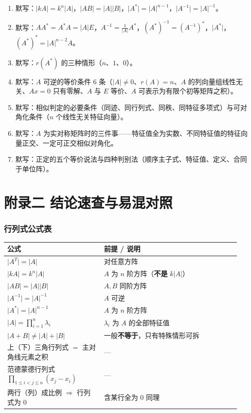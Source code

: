 \documentclass[11pt,openany,UTF8]{ctexbook}
\begin{document}
\begin{enumerate}
\item 默写：$\lvert kA\rvert=k^n\lvert A\rvert$，$\lvert AB\rvert=\lvert A\rvert\lvert B\rvert$，$\lvert A^*\rvert=\lvert A\rvert^{n-1}$，$\lvert A^{-1}\rvert=\lvert A\rvert^{-1}$。
\item 默写：$AA^*=A^*A=\lvert A\rvert E$，$A^{-1}=\frac{1}{\lvert A\rvert}A^*$，$(A^*)^{-1}=(A^{-1})^*$，$\lvert A^*\rvert$，$(A^*)^*=\lvert A\rvert^{n-2}A$。
\item 默写：$r(A^*)$ 的三种情形（$n$、$1$、$0$）。
\item 默写：$A$ 可逆的等价条件 6 条（$\lvert A\rvert\ne0$、$r(A)=n$、$A$ 的列向量组线性无关、$Ax=0$ 只有零解、$A$ 与 $E$ 等价、$A$ 可表示为有限个初等矩阵之积）。
\item 默写：相似判定的必要条件（同迹、同行列式、同秩、同特征多项式）与可对角化条件（$n$ 个线性无关特征向量）。
\item 默写：$A$ 为实对称矩阵时的三件事——特征值全为实数、不同特征值的特征向量正交、一定可正交相似对角化。
\item 默写：正定的五个等价说法与四种判别法（顺序主子式、特征值、定义、合同于单位阵）。
\end{enumerate}
\chapter*{附录二 结论速查与易混对照}
\subsection{行列式公式表}

\begingroup\small\setlength{\tabcolsep}{4.0pt}
\begin{longtable}{@{}L{0.3911\linewidth}L{0.5546\linewidth}@{}}
\toprule
\textbf{公式} & \textbf{前提 / 说明} \\
\midrule
\endhead
$\lvert A^T\rvert=\lvert A\rvert$ & 对任意方阵 \\
$\lvert kA\rvert=k^n\lvert A\rvert$ & $A$ 为 $n$ 阶方阵（\textbf{不是} $k\lvert A\rvert$） \\
$\lvert AB\rvert=\lvert A\rvert\lvert B\rvert$ & $A,B$ 同阶方阵 \\
$\lvert A^{-1}\rvert=\lvert A\rvert^{-1}$ & $A$ 可逆 \\
$\lvert A^*\rvert=\lvert A\rvert^{n-1}$ & $A$ 为 $n$ 阶方阵 \\
$\lvert A\rvert=\prod_{i=1}^{n}\lambda_i$ & $\lambda_i$ 为 $A$ 的全部特征值 \\
$\lvert A+B\rvert\ne\lvert A\rvert+\lvert B\rvert$ & 一般\textbf{不等于}，只有特殊情形可拆 \\
上（下）三角行列式 $=$ 主对角线元素之积 & — \\
范德蒙德行列式 $\prod_{1\le i<j\le n}(x_j-x_i)$ & — \\
两行（列）成比例 $\Rightarrow$ 行列式为 $0$ & 含某行全为 $0$ 同理 \\
\bottomrule
\end{longtable}
\endgroup
\end{document}
